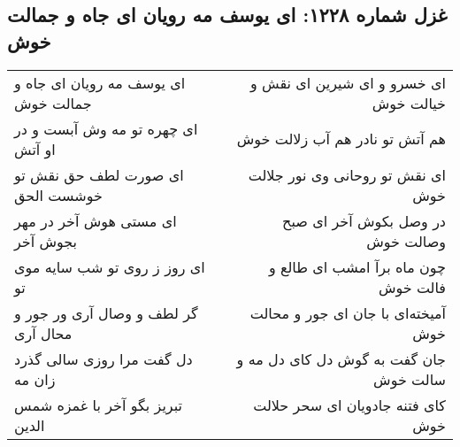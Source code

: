 \begin{center}
\section*{غزل شماره ۱۲۲۸: ای یوسف مه رویان ای جاه و جمالت خوش}
\label{sec:1228}
\begin{longtable}{l p{0.5cm} r}
ای یوسف مه رویان ای جاه و جمالت خوش
&&
ای خسرو و ای شیرین ای نقش و خیالت خوش
\\
ای چهره تو مه وش آبست و در او آتش
&&
هم آتش تو نادر هم آب زلالت خوش
\\
ای صورت لطف حق نقش تو خوشست الحق
&&
ای نقش تو روحانی وی نور جلالت خوش
\\
ای مستی هوش آخر در مهر بجوش آخر
&&
در وصل بکوش آخر ای صبح وصالت خوش
\\
ای روز ز روی تو شب سایه موی تو
&&
چون ماه برآ امشب ای طالع و فالت خوش
\\
گر لطف و وصال آری ور جور و محال آری
&&
آمیخته‌ای با جان ای جور و محالت خوش
\\
دل گفت مرا روزی سالی گذرد زان مه
&&
جان گفت به گوش دل کای دل مه و سالت خوش
\\
تبریز بگو آخر با غمزه شمس الدین
&&
کای فتنه جادویان ای سحر حلالت خوش
\\
\end{longtable}
\end{center}
